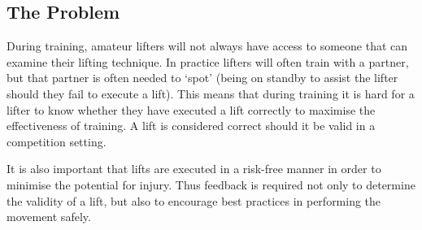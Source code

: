 \subsection{The Problem}

During training, amateur lifters will not always have access to someone that can examine their lifting technique. In practice lifters will often train with a partner, but that partner is often needed to `spot' (being on standby to assist the lifter should they fail to execute a lift). This means that during training it is hard for a lifter to know whether they have executed a lift correctly to maximise the effectiveness of training. A lift is considered correct should it be valid in a competition setting.

It is also important that lifts are executed in a risk-free manner in order to minimise the potential for injury. Thus feedback is required not only to determine the validity of a lift, but also to encourage best practices in performing the movement safely.